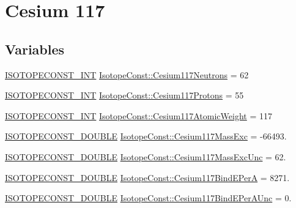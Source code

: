 \hypertarget{group___isotope_const-_cesium-_cs117}{}\section{Cesium 117}
\label{group___isotope_const-_cesium-_cs117}
\subsection*{Variables}
\begin{DoxyCompactItemize}
\item 
\mbox{\hyperlink{group___isotope_const-_macros_ga5f18360b3e99483a35c32d789e62621c}{I\+S\+O\+T\+O\+P\+E\+C\+O\+N\+S\+T\+\_\+\+I\+NT}} \mbox{\hyperlink{group___isotope_const-_cesium-_cs117_ga626b65b8283b28243e6ce4cd21fa1982}{Isotope\+Const\+::\+Cesium117\+Neutrons}} = 62
\item 
\mbox{\hyperlink{group___isotope_const-_macros_ga5f18360b3e99483a35c32d789e62621c}{I\+S\+O\+T\+O\+P\+E\+C\+O\+N\+S\+T\+\_\+\+I\+NT}} \mbox{\hyperlink{group___isotope_const-_cesium-_cs117_ga0ac83bc361caba960ad1070c598fc9f9}{Isotope\+Const\+::\+Cesium117\+Protons}} = 55
\item 
\mbox{\hyperlink{group___isotope_const-_macros_ga5f18360b3e99483a35c32d789e62621c}{I\+S\+O\+T\+O\+P\+E\+C\+O\+N\+S\+T\+\_\+\+I\+NT}} \mbox{\hyperlink{group___isotope_const-_cesium-_cs117_ga83df658dd9c24e2e1a1c1ade3ed6a693}{Isotope\+Const\+::\+Cesium117\+Atomic\+Weight}} = 117
\item 
\mbox{\hyperlink{group___isotope_const-_macros_ga8f45a7272ce02c0b4c65c44636ed719a}{I\+S\+O\+T\+O\+P\+E\+C\+O\+N\+S\+T\+\_\+\+D\+O\+U\+B\+LE}} \mbox{\hyperlink{group___isotope_const-_cesium-_cs117_gad90c615f0469504dd91ce5fd8f290341}{Isotope\+Const\+::\+Cesium117\+Mass\+Exc}} = -\/66493.
\item 
\mbox{\hyperlink{group___isotope_const-_macros_ga8f45a7272ce02c0b4c65c44636ed719a}{I\+S\+O\+T\+O\+P\+E\+C\+O\+N\+S\+T\+\_\+\+D\+O\+U\+B\+LE}} \mbox{\hyperlink{group___isotope_const-_cesium-_cs117_ga8abf8f738406cf7401ec77b883b1c1d4}{Isotope\+Const\+::\+Cesium117\+Mass\+Exc\+Unc}} = 62.
\item 
\mbox{\hyperlink{group___isotope_const-_macros_ga8f45a7272ce02c0b4c65c44636ed719a}{I\+S\+O\+T\+O\+P\+E\+C\+O\+N\+S\+T\+\_\+\+D\+O\+U\+B\+LE}} \mbox{\hyperlink{group___isotope_const-_cesium-_cs117_ga9794fb2954e90096a767902222c78778}{Isotope\+Const\+::\+Cesium117\+Bind\+E\+PerA}} = 8271.
\item 
\mbox{\hyperlink{group___isotope_const-_macros_ga8f45a7272ce02c0b4c65c44636ed719a}{I\+S\+O\+T\+O\+P\+E\+C\+O\+N\+S\+T\+\_\+\+D\+O\+U\+B\+LE}} \mbox{\hyperlink{group___isotope_const-_cesium-_cs117_gad18284428b7766e28946b731c677ed49}{Isotope\+Const\+::\+Cesium117\+Bind\+E\+Per\+A\+Unc}} = 0.

\end{DoxyCompactItemize}
